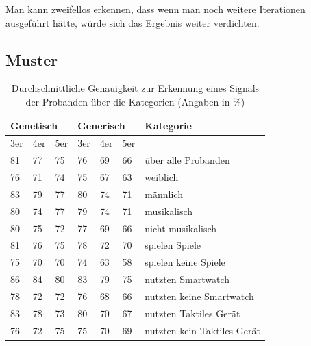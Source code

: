 Man kann zweifellos erkennen, dass wenn man noch weitere Iterationen ausgef{\"u}hrt h{\"a}tte, w{\"u}rde sich das Ergebnis weiter verdichten. 


\subsection{Muster}

\begin{table}[]
\centering
\caption{Durchschnittliche Genauigkeit zur Erkennung eines Signals der Probanden {\"u}ber die Kategorien (Angaben in \%)}
\label{MusterGenauigkeit}
\begin{tabular}{lll|lll|l}
\multicolumn{3}{l}{Genetisch} & \multicolumn{3}{|l|}{Generisch} & Kategorie      \\ \hline
3er    & 4er    & 5er   & 3er    & 4er    & 5er   &                             \\ \hline
81     & 77     & 75    & 76     & 69     & 66    & {\"u}ber alle Probanden         \\ \hline
76     & 71     & 74    & 75     & 67     & 63    & weiblich                    \\
83     & 79     & 77    & 80     & 74     & 71    & m{\"a}nnlich                    \\ \hline
80     & 74     & 77    & 79     & 74     & 71    & musikalisch                 \\
80     & 75     & 72    & 77     & 69     & 66    & nicht musikalisch           \\ \hline
81     & 76     & 75    & 78     & 72     & 70    & spielen Spiele              \\
75     & 70     & 70    & 74     & 63     & 58    & spielen keine Spiele        \\ \hline
86     & 84     & 80    & 83     & 79     & 75    & nutzten Smartwatch          \\
78     & 72     & 72    & 76     & 68     & 66    & nutzten keine Smartwatch    \\ \hline
83     & 78     & 73    & 80     & 70     & 67    & nutzten Taktiles Ger{\"a}t      \\
76     & 72     & 75    & 75     & 70     & 69    & nutzten kein Taktiles Ger{\"a}t
\end{tabular}
\end{table}

